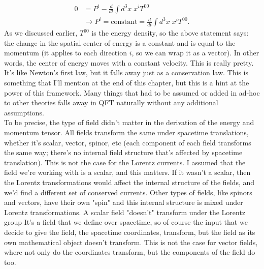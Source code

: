 \begin{align*}
    0&=P^i - \frac{d}{dt}\int d^3x\; x^i T^{00}\\
    &\rightarrow P^i = \text{constant} = \frac{d}{dt}\int d^3x\;x^iT^{00}.
\end{align*}
As we discussed earlier, $T^{00}$ is the energy density, so the above statement says: the change in the spatial center of energy is a constant and is equal to the momentum (it applies to each direction $i$, so we can wrap it as a vector). In other words, the center of energy moves with a constant velocity. This is really pretty. It's like Newton's first law, but it falls away just as a conservation law. This is something that I'll mention at the end of this chapter, but this is a hint at the power of this framework. Many things that had to be assumed or added in ad-hoc to other theories falls away in QFT naturally without any additional assumptions. \\

\noindent To be precise, the type of field didn't matter in the derivation of the energy and momentum tensor. All fields transform the same under spacetime translations, whether it's scalar, vector, spinor, etc (each component of each field transforms the same way; there's no internal field structure that's affected by spacetime translation). This is not the case for the Lorentz currents. I assumed that the field we're working with is a scalar, and this matters. If it wasn't a scalar, then the Lorentz transformations would affect the internal structure of the fields, and we'd find a different set of conserved currents. Other types of fields, like spinors and vectors, have their own "spin" and this internal structure is mixed under Lorentz transformations. A scalar field "doesn't" transform under the Lorentz group It's a field that we define over spacetime, so of course the input that we decide to give the field, the spacetime coordinates, transform, but the field as its own mathematical object doesn't transform. This is not the case for vector fields, where not only do the coordinates transform, but the components of the field do too.

